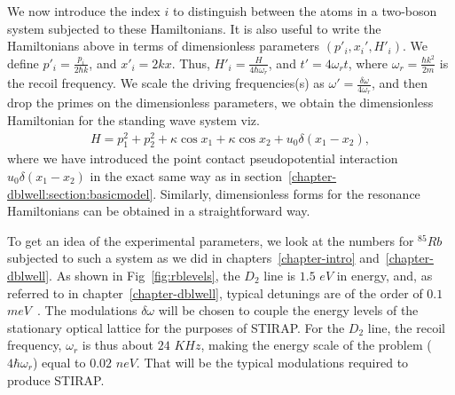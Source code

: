 We now introduce the index $i$ to distinguish between the atoms in a two-boson system subjected to these Hamiltonians. It is also useful to write the Hamiltonians above in terms of dimensionless parameters $(p'_i, x_i',H'_i)$. We define $p'_i=\frac{p_i}{2\hbar k}$, and $x'_i=2 k x$. Thus, $H'_i=\frac{H}{4\hbar\omega_r}$, and $t'=4\omega_r t$, where $\omega_r=\frac{\hbar k^2}{2m}$ is the recoil frequency. We scale the driving frequencies(s) as $\omega'=\frac{\delta\omega}{4\omega_r}$, and then drop the primes on the dimensionless parameters, we obtain the dimensionless Hamiltonian for the standing wave system viz.
\begin{eqnarray}
H=p^2_1 + p^2_2+\kappa \cos{x_1}+\kappa \cos{x_2} + u_0 \delta(x_1-x_2),
\label{eq:hamscale:chapter-oplattice}
\end{eqnarray}
where we have introduced the point contact pseudopotential interaction $u_0 \delta(x_1-x_2)$ in the exact same way as in section~\ref{chapter-dblwell:section:basicmodel}. Similarly, dimensionless forms for the resonance Hamiltonians can be obtained in a straightforward way.

To get an idea of the experimental parameters, we look at the numbers for $^{85}Rb$ subjected to such a system as we did in chapters~\ref{chapter-intro} and~\ref{chapter-dblwell}. As shown in Fig~\ref{fig:rblevels}, the $D_2$ line is $1.5$ $eV$ in energy, and, as referred to in chapter~\ref{chapter-dblwell}, typical detunings are of the order of $0.1$ $meV$~\cite{steck}. The modulations $\delta \omega$ will be chosen to couple the energy levels of the stationary optical lattice for the purposes of STIRAP. For the $D_2$ line, the recoil frequency, $ \omega_r$ is thus about $24$ $KHz$, making the energy scale of the problem ($4 \hbar \omega_r$) equal to $0.02$ $neV$. That will be the typical modulations required to produce STIRAP.

